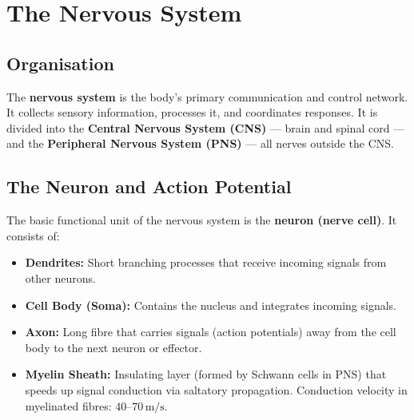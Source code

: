 \documentclass[12pt,a4paper]{article}
\begin{document}
\section{The Nervous System}

\subsection{Organisation}

\begin{tcolorbox}[defbox, title={\textbf{Definition: Nervous System}}]
The \textbf{nervous system} is the body's primary communication and control network. It collects sensory information, processes it, and coordinates responses. It is divided into the \textbf{Central Nervous System (CNS)} --- brain and spinal cord --- and the \textbf{Peripheral Nervous System (PNS)} --- all nerves outside the CNS.
\end{tcolorbox}

\subsection{The Neuron and Action Potential}

The basic functional unit of the nervous system is the \textbf{neuron (nerve cell)}. It consists of:
\begin{itemize}[leftmargin=*, itemsep=3pt]
  \item \textbf{Dendrites:} Short branching processes that receive incoming signals from other neurons.
  \item \textbf{Cell Body (Soma):} Contains the nucleus and integrates incoming signals.
  \item \textbf{Axon:} Long fibre that carries signals (action potentials) away from the cell body to the next neuron or effector.
  \item \textbf{Myelin Sheath:} Insulating layer (formed by Schwann cells in PNS) that speeds up signal conduction via saltatory propagation. Conduction velocity in myelinated fibres: $40$--$70\,\text{m/s}$.
\end{itemize}
\end{document}
